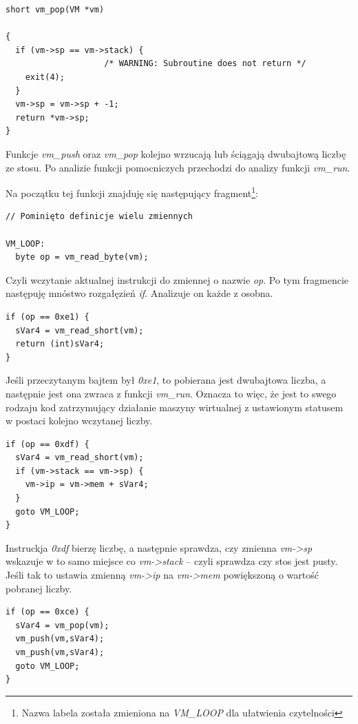 \documentclass[language=polish,type=eng]{aghmodern}
\begin{document}
\begin{verbatim}
short vm_pop(VM *vm)

{
  if (vm->sp == vm->stack) {
                    /* WARNING: Subroutine does not return */
    exit(4);
  }
  vm->sp = vm->sp + -1;
  return *vm->sp;
}
\end{verbatim}

Funkcje \emph{vm\_push} oraz \emph{vm\_pop} kolejno wrzucają lub ściągają dwubajtową
liczbę ze stosu. Po analizie funkcji pomocniczych przechodzi do analizy funkcji
\emph{vm\_run}.

Na początku tej funkcji znajduję się następujący fragment\footnote{Nazwa labela została
zmieniona na \emph{VM\_LOOP} dla ułatwienia czytelności}:

\begin{verbatim}
// Pominięto definicje wielu zmiennych

VM_LOOP:
  byte op = vm_read_byte(vm);
\end{verbatim}

Czyli wczytanie aktualnej instrukcji do zmiennej o nazwie \emph{op}. Po tym fragmencie
następuję mnóstwo rozgałęzień \emph{if}. Analizuje on każde z osobna.

\begin{verbatim}
if (op == 0xe1) {
  sVar4 = vm_read_short(vm);
  return (int)sVar4;
}
\end{verbatim}

Jeśli przeczytanym bajtem był \emph{0xe1}, to pobierana jest dwubajtowa liczba, a następnie
jest ona zwraca z funkcji \emph{vm\_run}. Oznacza to więc, że jest to swego rodzaju kod
zatrzymujący działanie maszyny wirtualnej z ustawionym statusem w postaci kolejno
wczytanej liczby.

\begin{verbatim}
if (op == 0xdf) {
  sVar4 = vm_read_short(vm);
  if (vm->stack == vm->sp) {
    vm->ip = vm->mem + sVar4;
  }
  goto VM_LOOP;
}
\end{verbatim}

Instruckja \emph{0xdf} bierzę liczbę, a następnie sprawdza, czy zmienna \emph{vm->sp} wskazuje
w to samo miejsce co \emph{vm->stack} -- czyli sprawdza czy stos jest pusty. Jeśli tak
to ustawia zmienną \emph{vm->ip} na \emph{vm->mem} powiększoną o wartość pobranej liczby.

\begin{verbatim}
if (op == 0xce) {
  sVar4 = vm_pop(vm);
  vm_push(vm,sVar4);
  vm_push(vm,sVar4);
  goto VM_LOOP;
}
\end{verbatim}
\end{document}
